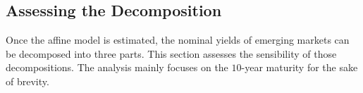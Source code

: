 {%



\subsection{Assessing the Decomposition}
\iftoggle{toclinks}{\gototoc}{} %
Once the affine model is estimated, the nominal yields of 
emerging markets can be decomposed into three parts.
This section assesses the sensibility of those decompositions. %
The analysis mainly focuses on the \(10\)-year maturity for the sake of brevity.
%	

}
